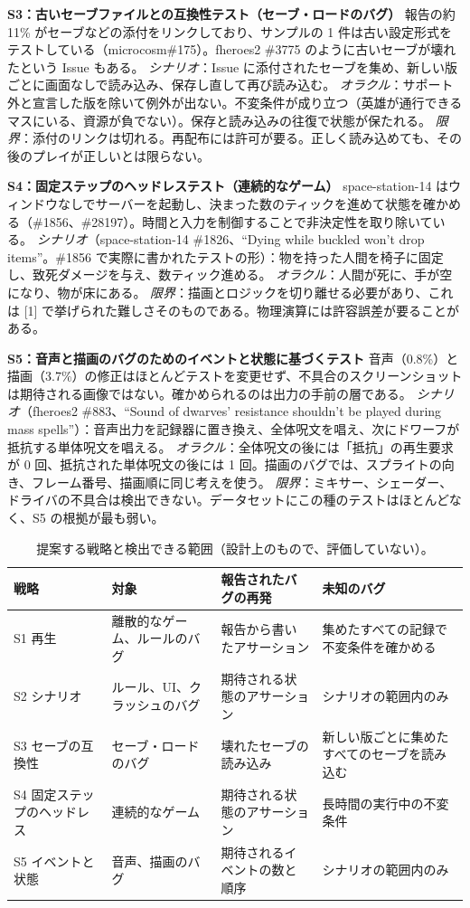 \documentclass[a4paper,twocolumn,9pt]{ltjsarticle}
\newcommand{\para}[1]{\par\smallskip\noindent\textbf{#1}\quad}
\begin{document}
\para{S3：古いセーブファイルとの互換性テスト（セーブ・ロードのバグ）}
報告の約 11\% がセーブなどの添付をリンクしており、サンプルの 1 件は古い設定形式をテストしている（microcosm\#175）。fheroes2 \#3775 のように古いセーブが壊れたという Issue もある。
\emph{シナリオ}：Issue に添付されたセーブを集め、新しい版ごとに画面なしで読み込み、保存し直して再び読み込む。
\emph{オラクル}：サポート外と宣言した版を除いて例外が出ない。不変条件が成り立つ（英雄が通行できるマスにいる、資源が負でない）。保存と読み込みの往復で状態が保たれる。
\emph{限界}：添付のリンクは切れる。再配布には許可が要る。正しく読み込めても、その後のプレイが正しいとは限らない。

\para{S4：固定ステップのヘッドレステスト（連続的なゲーム）}
space-station-14 はウィンドウなしでサーバーを起動し、決まった数のティックを進めて状態を確かめる（\#1856、\#28197）。時間と入力を制御することで非決定性を取り除いている。
\emph{シナリオ}（space-station-14 \#1826、``Dying while buckled won't drop items''。\#1856 で実際に書かれたテストの形）：物を持った人間を椅子に固定し、致死ダメージを与え、数ティック進める。
\emph{オラクル}：人間が死に、手が空になり、物が床にある。
\emph{限界}：描画とロジックを切り離せる必要があり、これは [1] で挙げられた難しさそのものである。物理演算には許容誤差が要ることがある。

\para{S5：音声と描画のバグのためのイベントと状態に基づくテスト}
音声（0.8\%）と描画（3.7\%）の修正はほとんどテストを変更せず、不具合のスクリーンショットは期待される画像ではない。確かめられるのは出力の手前の層である。
\emph{シナリオ}（fheroes2 \#883、``Sound of dwarves' resistance shouldn't be played during mass spells''）：音声出力を記録器に置き換え、全体呪文を唱え、次にドワーフが抵抗する単体呪文を唱える。
\emph{オラクル}：全体呪文の後には「抵抗」の再生要求が 0 回、抵抗された単体呪文の後には 1 回。描画のバグでは、スプライトの向き、フレーム番号、描画順に同じ考えを使う。
\emph{限界}：ミキサー、シェーダー、ドライバの不具合は検出できない。データセットにこの種のテストはほとんどなく、S5 の根拠が最も弱い。

\begin{table}[tb]
\centering
\caption{提案する戦略と検出できる範囲（設計上のもので、評価していない）。}\label{tab:detect}
\small
\begin{tabularx}{\textwidth}{@{}P{34mm}P{34mm}LL@{}}
\toprule
戦略 & 対象 & 報告されたバグの再発 & 未知のバグ\\
\midrule
S1 再生 & 離散的なゲーム、ルールのバグ & 報告から書いたアサーション & 集めたすべての記録で不変条件を確かめる\\
S2 シナリオ & ルール、UI、クラッシュのバグ & 期待される状態のアサーション & シナリオの範囲内のみ\\
S3 セーブの互換性 & セーブ・ロードのバグ & 壊れたセーブの読み込み & 新しい版ごとに集めたすべてのセーブを読み込む\\
S4 固定ステップのヘッドレス & 連続的なゲーム & 期待される状態のアサーション & 長時間の実行中の不変条件\\
S5 イベントと状態 & 音声、描画のバグ & 期待されるイベントの数と順序 & シナリオの範囲内のみ\\
\bottomrule
\end{tabularx}
\end{table}
\end{document}
